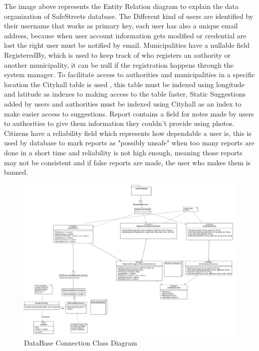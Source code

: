 The image above represents the Entity Relation diagram to explain the data organization of SafeStreets database. The Different kind of users are identified by their username that works as primary key, each user has also a unique email address, because when user account information gets modified or credential are lost the right user must be notified by email. Municipalities have a nullable field RegisteredBy, which is used to keep track of who registers an authority or another municipality, it can be null if the registration happens through the system manager. To facilitate access to authorities and municipalities in a specific location the Cityhall table is used , this table must be indexed using longitude and latitude as indexes to making access to the table faster, Static Suggestions added by users and authorities must be indexed using Cityhall as an index to make easier access to suggestions. Report contains a field for notes made by users to authorities to give them information they couldn’t provide using photos. Citizens have a reliability field which represents how dependable a user is, this is used by database to mark reports as "possibly unsafe" when too many reports are done in a short time and reliability is not high enough, meaning those reports may not be consistent and if false reports are made, the user who makes them is banned.
\begin{figure}[H]
\centering
\includegraphics[width=\textwidth]{Images/DatabaseConnectionClassDiagram.png}
\caption{\label{fig:ComWI}DataBase Connection Class Diagram }
\end{figure}
